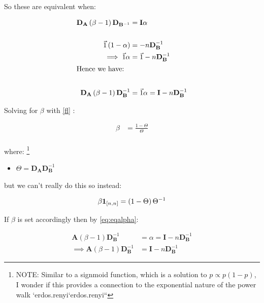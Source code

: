 \documentclass[11pt]{article}
\begin{document}
So these are equivalent when:

\begin{align}
\mathbf{D}_{\mathbf{A}}   \left( \beta -  1 \right)\mathbf{D}_{\mathbf{B}^{- 1}} &=\mathbf{I}  \alpha \label{fl} \\
    \ \nonumber \\
  \vec{1}  \left( 1- \alpha \right) &=  - n \mathbf{D}_{\mathbf{B}}^{- 1}  \nonumber \\
    \implies  \vec{1}\alpha &=  \vec{1}- n \mathbf{D}_{\mathbf{B}}^{- 1} \label{st} \\
    \intertext{Hence we have:} \notag \\
\mathbf{D}_{\mathbf{A}}  \left( \beta -  1 \right)\mathbf{D}_{\mathbf{B}}^{- 1} &=  \vec{1}\alpha =  \mathbf{I}- n \mathbf{D}_{\mathbf{B}}^{- 1} \label{eq:eqalpha}
\end{align}


Solving for \(\beta\)  with \eqref{fl} :

\begin{align}
    \beta&= \frac{1- \Theta}{\Theta}\\
\end{align}

where: \footnote{NOTE: Similar to a signmoid function, which is a solution to \(p \propto p(1-p)\), I wonder if this provides a connection to the exponential nature of the power walk
`﻿erdos.renyi﻿`﻿erdos.renyi﻿``}

\begin{itemize}
\item \(\Theta = \mathbf{D}_{\mathbf{A}} \mathbf{D}_{\mathbf{B}}^{- 1}\)
\end{itemize}

but we can't really do this so instead:

\[
\beta \mathbf{1}_{\tiny \left[ n,n \right]}  = \left( 1 - \Theta \right) \Theta^{-1} \label{eq:betadef}
\]

If \(\beta\) is set accordingly then by \eqref{eq:eqalpha}:

\begin{align}
    \mathbf{A}\left( \beta- 1 \right) \mathbf{D}_{\mathbf{B}}^{- 1} &= \alpha = \mathbf{I}- n \mathbf{D}_{\mathbf{B}}^{- 1} \nonumber \\
     \implies  \mathbf{A}\left( \beta- 1 \right) \mathbf{D}_{\mathbf{B}}^{- 1} &=  \mathbf{I}- n \mathbf{D}_{\mathbf{B}}^{- 1}
\end{align}
\end{document}
